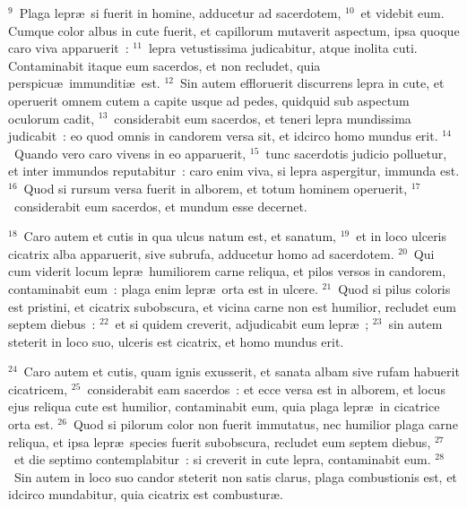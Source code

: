 ${}^{9}$~Plaga lepr\ae\ si fuerit in homine, adducetur ad sacerdotem,
${}^{10}$~et videbit eum. Cumque color albus in cute fuerit, et capillorum mutaverit aspectum, ipsa quoque caro viva apparuerit~:
${}^{11}$~lepra vetustissima judicabitur, atque inolita cuti. Contaminabit itaque eum sacerdos, et non recludet, quia perspicu\ae\ immunditi\ae\ est.
${}^{12}$~Sin autem effloruerit discurrens lepra in cute, et operuerit omnem cutem a capite usque ad pedes, quidquid sub aspectum oculorum cadit,
${}^{13}$~considerabit eum sacerdos, et teneri lepra mundissima judicabit~: eo quod omnis in candorem versa sit, et idcirco homo mundus erit.
${}^{14}$~Quando vero caro vivens in eo apparuerit,
${}^{15}$~tunc sacerdotis judicio polluetur, et inter immundos reputabitur~: caro enim viva, si lepra aspergitur, immunda est.
${}^{16}$~Quod si rursum versa fuerit in alborem, et totum hominem operuerit,
${}^{17}$~considerabit eum sacerdos, et mundum esse decernet.


${}^{18}$~Caro autem et cutis in qua ulcus natum est, et sanatum,
${}^{19}$~et in loco ulceris cicatrix alba apparuerit, sive subrufa, adducetur homo ad sacerdotem.
${}^{20}$~Qui cum viderit locum lepr\ae\ humiliorem carne reliqua, et pilos versos in candorem, contaminabit eum~: plaga enim lepr\ae\ orta est in ulcere.
${}^{21}$~Quod si pilus coloris est pristini, et cicatrix subobscura, et vicina carne non est humilior, recludet eum septem diebus~:
${}^{22}$~et si quidem creverit, adjudicabit eum lepr\ae~;
${}^{23}$~sin autem steterit in loco suo, ulceris est cicatrix, et homo mundus erit.


${}^{24}$~Caro autem et cutis, quam ignis exusserit, et sanata albam sive rufam habuerit cicatricem,
${}^{25}$~considerabit eam sacerdos~: et ecce versa est in alborem, et locus ejus reliqua cute est humilior, contaminabit eum, quia plaga lepr\ae\ in cicatrice orta est.
${}^{26}$~Quod si pilorum color non fuerit immutatus, nec humilior plaga carne reliqua, et ipsa lepr\ae\ species fuerit subobscura, recludet eum septem diebus,
${}^{27}$~et die septimo contemplabitur~: si creverit in cute lepra, contaminabit eum.
${}^{28}$~Sin autem in loco suo candor steterit non satis clarus, plaga combustionis est, et idcirco mundabitur, quia cicatrix est combustur\ae .


